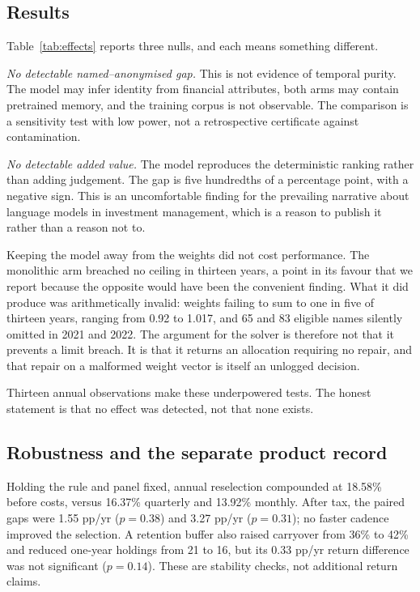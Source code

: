 \documentclass[10pt,conference]{IEEEtran}
\begin{document}
\subsection{Results}

Table~\ref{tab:effects} reports three nulls, and each means something different.

\emph{No detectable named--anonymised gap.} This is not evidence of temporal purity. The model may infer identity from financial attributes, both arms may contain pretrained memory, and the training corpus is not observable. The comparison is a sensitivity test with low power, not a retrospective certificate against contamination.

\emph{No detectable added value.} The model reproduces the deterministic ranking rather than adding judgement. The gap is five hundredths of a percentage point, with a negative sign. This is an uncomfortable finding for the prevailing narrative about language models in investment management, which is a reason to publish it rather than a reason not to.

Keeping the model away from the weights did not cost performance. The monolithic arm breached no ceiling in thirteen years, a point in its favour that we report because the opposite would have been the convenient finding. What it did produce was arithmetically invalid: weights failing to sum to one in five of thirteen years, ranging from 0.92 to 1.017, and 65 and 83 eligible names silently omitted in 2021 and 2022. The argument for the solver is therefore not that it prevents a limit breach. It is that it returns an allocation requiring no repair, and that repair on a malformed weight vector is itself an unlogged decision.

Thirteen annual observations make these underpowered tests. The honest statement is that no effect was detected, not that none exists.

\subsection{Robustness and the separate product record}

Holding the rule and panel fixed, annual reselection compounded at 18.58\% before costs, versus 16.37\% quarterly and 13.92\% monthly. After tax, the paired gaps were 1.55 pp/yr ($p=0.38$) and 3.27 pp/yr ($p=0.31$); no faster cadence improved the selection. A retention buffer also raised carryover from 36\% to 42\% and reduced one-year holdings from 21 to 16, but its 0.33 pp/yr return difference was not significant ($p=0.14$). These are stability checks, not additional return claims.
\end{document}
